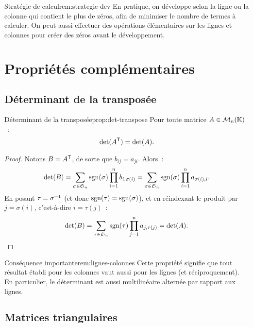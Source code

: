 \begin{remark}{Stratégie de calcul}{rem:strategie-dev}
  En pratique, on développe selon la ligne ou la colonne qui contient le
  plus de zéros, afin de minimiser le nombre de termes à calculer. On
  peut aussi effectuer des opérations élémentaires sur les lignes et
  colonnes pour créer des zéros avant le développement.
\end{remark}

\section{Propriétés complémentaires}\label{sec:proprietes-complementaires}

\subsection{Déterminant de la transposée}\label{subsec:det-transpose}

\begin{proposition}{Déterminant de la transposée}{prop:det-transpose}
  Pour toute matrice $A\in\mathcal{M}_n({\mathbb{K}})$~:
  \[
    \det({A}^{\mathsf{T}})=\det(A).
  \]
\end{proposition}

\begin{proof}
  Notons $B={A}^{\mathsf{T}}$, de sorte que $b_{ij}=a_{ji}$. Alors~:
  \[
    \det(B)=\sum_{\sigma\in\mathfrak{S}_n}\operatorname{sgn}(\sigma)
    \prod_{i=1}^{n}b_{i,\sigma(i)}
    =\sum_{\sigma\in\mathfrak{S}_n}\operatorname{sgn}(\sigma)
    \prod_{i=1}^{n}a_{\sigma(i),i}.
  \]
  En posant $\tau={\sigma}^{-1}$ (et donc $\operatorname{sgn}(\tau)=\operatorname{sgn}(\sigma)$), et
  en réindexant le produit par $j=\sigma(i)$, c'est-à-dire $i=\tau(j)$~:
  \[
    \det(B)=\sum_{\tau\in\mathfrak{S}_n}\operatorname{sgn}(\tau)
    \prod_{j=1}^{n}a_{j,\tau(j)}=\det(A).
    \qedhere
  \]
\end{proof}

\begin{remark}{Conséquence importante}{rem:lignes-colonnes}
  Cette propriété signifie que tout résultat établi pour les colonnes
  vaut aussi pour les lignes (et réciproquement). En particulier, le
  déterminant est aussi multilinéaire alternée par rapport aux lignes.
\end{remark}

\subsection{Matrices triangulaires}\label{subsec:det-triangulaires}

